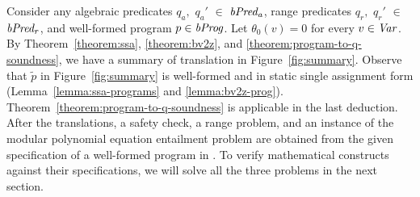 
Consider any algebraic predicates $q_a,$ $q_a'$ $\in$ $\mathit{bPred_a}$, range predicates $q_r,$ $q_r'$ $\in$ $\mathit{bPred_r}$, and well-formed program $p \in
\mathit{bProg}$. Let $\theta_0 (v) = 0$ for every $v \in \mathit{Var}$. By
Theorem~\ref{theorem:ssa}, \ref{theorem:bv2z}, and \ref{theorem:program-to-q-soundness}, we have a summary of translation in Figure~\ref{fig:summary}.
Observe that $\tilde{p}$ in Figure~\ref{fig:summary} is well-formed and in static single assignment
form (Lemma~\ref{lemma:ssa-programs} and \ref{lemma:bv2z-prog}).
Theorem~\ref{theorem:program-to-q-soundness} is applicable in the last
deduction. After the translations, a safety check, a range problem, and an instance of the modular
polynomial equation entailment problem are obtained from the given
specification of a well-formed program in \bvdsl.
To verify mathematical constructs against their specifications, we will solve all the three problems in the next section.

